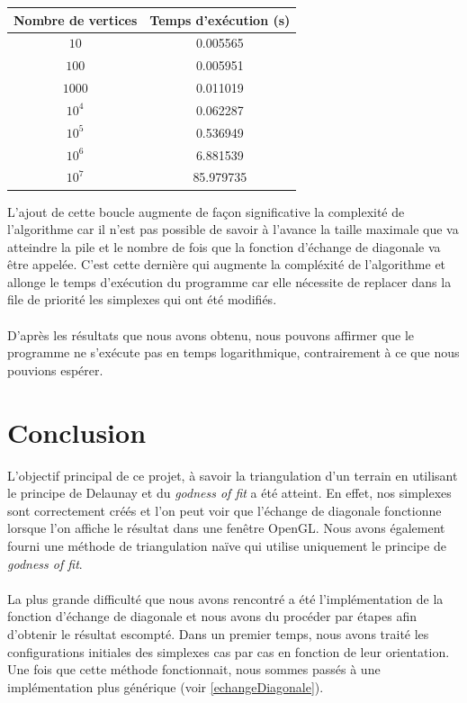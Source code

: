 \documentclass{article}
\begin{document}
        \begin{center}
            \begin{tabular}{|c|c|}\hline \label{tempsDelaunay}
                Nombre de vertices & Temps d'exécution (s) \\
                \hline
                $10$ &  0.005565 \\
                $100$ & 0.005951 \\
                $1000$ & 0.011019 \\
                $10^4$ & 0.062287 \\
                $10^5$ & 0.536949 \\
                $10^6$ & 6.881539 \\
                $10^7$ & 85.979735 \\
                \hline
            \end{tabular}
        \end{center}
        
        L'ajout de cette boucle augmente de façon significative la complexité de l'algorithme car il n'est pas possible de savoir à l'avance la taille maximale que va atteindre la pile et le nombre de fois que la fonction d'échange de diagonale va être appelée. C'est cette dernière qui augmente la compléxité de l'algorithme et allonge le temps d'exécution du programme car elle nécessite de replacer dans la file de priorité les simplexes qui ont été modifiés. 
        \paragraph{}
        D'après les résultats que nous avons obtenu, nous pouvons affirmer que le programme ne s'exécute pas en temps logarithmique, contrairement à ce que nous pouvions espérer.


\section{Conclusion}    

    L'objectif principal de ce projet, à savoir la triangulation d'un terrain en utilisant le principe de Delaunay et du \textit{godness of fit} a été atteint. En effet, nos simplexes sont correctement créés et l'on peut voir que l'échange de diagonale fonctionne lorsque l'on affiche le résultat dans une fenêtre OpenGL. Nous avons également fourni une méthode de triangulation naïve qui utilise uniquement le principe de \textit{godness of fit}.
    
    \paragraph{}
    La plus grande difficulté que nous avons rencontré a été l'implémentation de la fonction d'échange de diagonale et nous avons du procéder par étapes afin d'obtenir le résultat escompté. Dans un premier temps, nous avons traité les configurations initiales des simplexes cas par cas en fonction de leur orientation. Une fois que cette méthode fonctionnait, nous sommes passés à une implémentation plus générique (voir \ref{echangeDiagonale}).
\end{document}
